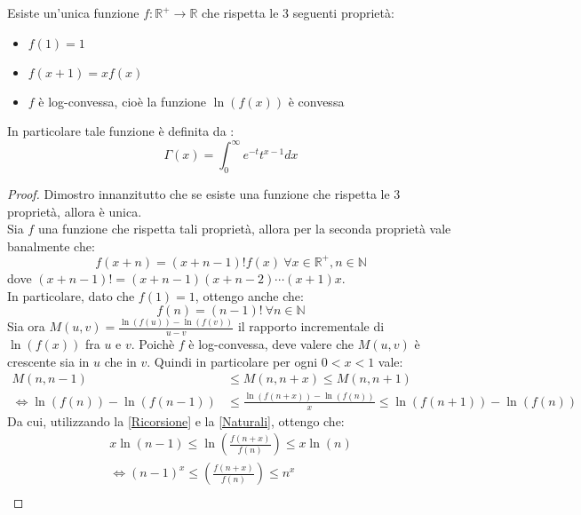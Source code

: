 \begin{theorem}
\label{BohrMollerup}
Esiste un'unica funzione $f :\mathbb{R}^{+}\rightarrow\mathbb{R} $ che rispetta le 3 seguenti proprietà:
\begin{itemize}
 \item $f(1)=1$
 \item $f(x+1)=xf(x)$
 \item $f$ è log-convessa, cioè la funzione $\ln(f(x))$ è convessa
\end{itemize}
In particolare tale funzione è definita da :
\begin{equation}
 \label{GammaDefinition}
 \Gamma(x)=\int_0^{\infty}{e^{-t}t^{x-1}dx}
\end{equation}
\end{theorem}
\begin{proof}
Dimostro innanzitutto che se esiste una funzione che rispetta le 3 proprietà, allora è unica.\\
Sia $f$ una funzione che rispetta tali proprietà, allora per la seconda proprietà vale banalmente che:
\begin{equation}
 \label{Ricorsione}
 f(x+n)=(x+n-1)!f(x)\ \forall x\in \mathbb{R}^+, n\in\mathbb{N}
\end{equation}
dove $(x+n-1)!=(x+n-1)(x+n-2)\cdots(x+1)x$.\\
In particolare, dato che $f(1)=1$, ottengo anche che:
\begin{equation}
 \label{Naturali}
 f(n)=(n-1)!\ \forall n\in \mathbb{N}
\end{equation}
Sia ora $M(u,v)=\frac{\ln(f(u))-\ln(f(v))}{u-v}$ il rapporto incrementale
di $\ln(f(x))$ fra $u$ e $v$. Poichè $f$ è log-convessa, deve valere che $M(u,v)$ è crescente sia in $u$ che in $v$.
Quindi in particolare per ogni $0<x<1$ vale:
\begin{equation*}
 \begin{split}
  M(n,n-1) & \le M(n,n+x) \le M(n,n+1) \\
  \iff \ln(f(n))-\ln(f(n-1)) & \le \frac{\ln(f(n+x))-\ln(f(n))}{x} \le \ln(f(n+1))-\ln(f(n)) 
  \end{split}
\end{equation*}
Da cui, utilizzando la \cref{Ricorsione} e la \cref{Naturali}, ottengo che:
\begin{gather*}
  x \ln(n-1) \le \ln \left( \frac{f(n+x)}{f(n)} \right) \le x\ln(n)\\
  \iff (n-1)^x \le \left( \frac{f(n+x)}{f(n)} \right) \le n^x \\

\end{gather*}
\end{proof}
